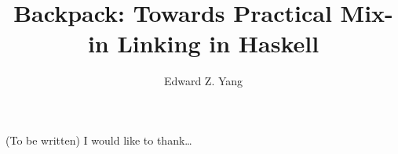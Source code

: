 \documentclass{report}
\begin{document}
\title{Backpack: Towards Practical Mix-in Linking in Haskell}
\author{Edward Z. Yang}

\beforepreface%
    (To be written)
    I would like to thank\ldots
\afterpreface%












\end{document}
